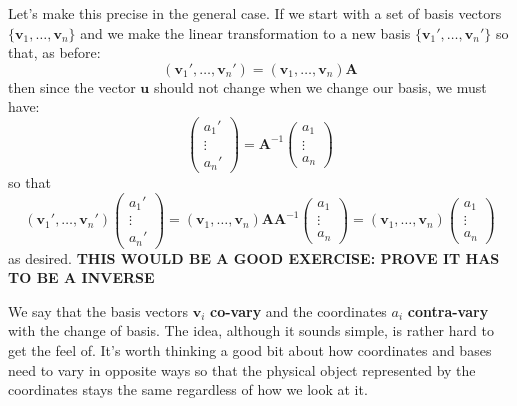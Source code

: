 	Let's make this precise in the general case. If we start with a set of basis vectors $\{\mathbf v_1, \dots, \mathbf v_n\}$ and we make the linear transformation to a new basis $\{\mathbf v_1', \dots, \mathbf v_n' \}$ so that, as before:
	\begin{equation}\label{eq:CovariantTransform2}
		(\mathbf v_1', \dots, \mathbf v_n') = (\mathbf v_1, \dots, \mathbf v_n ) \mathbf A
	\end{equation}
	then since the vector $\mathbf u$ should not change when we change our basis, we must have: 
	\begin{equation}\label{eq:ContravariantTransform2}
		\begin{pmatrix}
			a_1' \\ \vdots \\ a_n'
		\end{pmatrix}
		= 
		\mathbf{A}^{-1}
		\begin{pmatrix}
			a_1 \\ \vdots \\ a_n
		\end{pmatrix}
	\end{equation}
	so that 
	\begin{equation*}
		(\mathbf v_1', \dots, \mathbf v_n') 
		\begin{pmatrix}
			a_1' \\ \vdots \\ a_n'
		\end{pmatrix} 
		= (\mathbf v_1, \dots, \mathbf v_n ) \mathbf A \mathbf A^{-1} 
		\begin{pmatrix}
			a_1 \\ \vdots \\ a_n
		\end{pmatrix}
		= (\mathbf v_1, \dots, \mathbf v_n ) 
		\begin{pmatrix}
			a_1 \\ \vdots \\ a_n
		\end{pmatrix}
	\end{equation*}
	as desired. \textbf{THIS WOULD BE A GOOD EXERCISE: PROVE IT HAS TO BE A INVERSE}
	
	We say that the basis vectors $\mathbf v_i$ \textbf{co-vary} and the coordinates $a_i$ \textbf{contra-vary} with the change of basis. The idea, although it sounds simple, is rather hard to get the feel of. It's worth thinking a good bit about how coordinates and bases need to vary in opposite ways so that the physical object represented by the coordinates stays the same regardless of how we look at it. 
	
